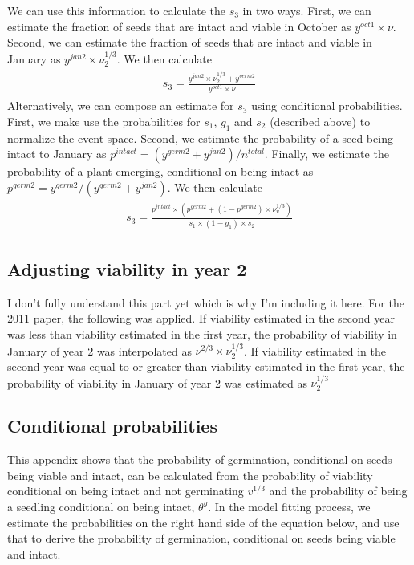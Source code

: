 \documentclass[12pt, oneside]{article}   	%
\begin{document}
We can use this information to calculate the $s_3$ in two ways. First, we can estimate the fraction of seeds that are intact and viable in October as $y^{oct1}\times \nu$. Second, we can estimate the fraction of seeds that are intact and viable in January as $y^{jan2}\times \nu_2^{1/3}$. We then calculate 
%
    \begin{align}
\begin{split}
s_3 = \frac{y^{jan2}\times \nu_2^{1/3} + y^{germ2}}{y^{oct1}\times \nu}
  \end{split}
\end{align}
%
Alternatively, we can compose an estimate for $s_3$ using conditional probabilities. First, we make use the probabilities for $s_1$, $g_1$ and $s_2$ (described above) to normalize the event space. Second, we estimate the probability of a seed being intact to January as $p^{intact} = (y^{germ2}+y^{jan2})/n^{total}$. Finally, we estimate the probability of a plant emerging, conditional on being intact as $p^{germ2} = y^{germ2}/(y^{germ2}+y^{jan2})$. We then calculate 
%
    \begin{align}
\begin{split}
s_3 = \frac{p^{intact} \times (p^{germ2} + ( 1- p^{germ2} ) \times \nu_v^{1/3} )}{s_1 \times (1-g_1) \times s_2 }
  \end{split}
\end{align}
%

\subsection*{Adjusting viability in year 2}

I don't fully understand this part yet which is why I'm including it here. For the 2011 paper, the following was applied. If viability estimated in the second year was less than viability estimated in the first year, the probability of viability in January of year 2 was interpolated as $\nu^{2/3} \times \nu_2^{1/3} $. If viability estimated in the second year was equal to or greater than viability estimated in the first year, the probability of viability in January of year 2 was estimated as $\nu_2^{1/3} $


\subsection*{Conditional probabilities}
This appendix shows that the probability of germination, conditional on seeds being viable and intact, can be calculated from the probability of viability conditional on being intact and not germinating $v^{1/3}$ and the probability of being a seedling conditional on being intact, $\theta^g$. In the model fitting process, we estimate the probabilities on the right hand side of the equation below, and use that to derive the probability of germination, conditional on seeds being viable and intact.
\end{document}
